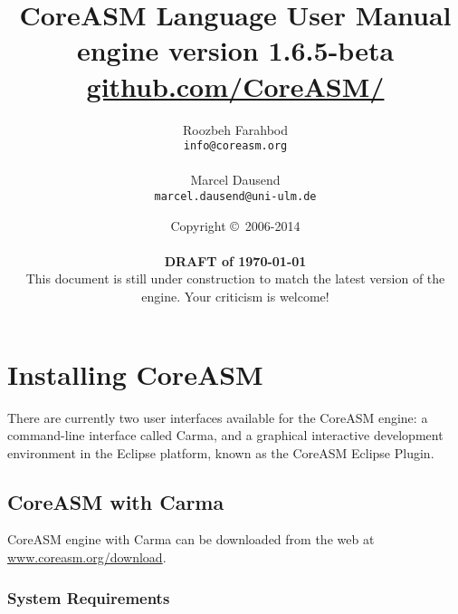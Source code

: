 \documentclass{article}
\newcommand{\version}{1.6.5-beta}
\newcommand{\CoreASM}{{\sffamily CoreASM}\xspace}
\newcommand{\Carma}{{\sffamily Carma}\xspace}
\newcommand{\copyrightNotice}[1]{{Copyright \copyright\ #1}}
\begin{document}

\title{\huge \CoreASM Language User Manual \\ {\Large engine version \version} \\ {\large \url{github.com/CoreASM/}}}

\author{Roozbeh Farahbod \\ \texttt{info@coreasm.org}\\\\Marcel Dausend \\ \texttt{marcel.dausend@uni-ulm.de}}  

\date{\copyrightNotice{2006-2014} \\~\\ {\bf DRAFT of \today} \\ {This document is still under construction to match the latest version of the engine. Your criticism is welcome!}}

 \maketitle

\newpage
\tableofcontents
\newpage


\section{Installing \CoreASM}

There are currently two user interfaces available for the \CoreASM engine: a
command-line interface called \Carma, and a graphical interactive
development environment in the Eclipse platform, known as the \CoreASM Eclipse
Plugin.


\subsection{\CoreASM with \Carma}

\CoreASM engine with \Carma can be downloaded from the web at \url{www.coreasm.org/download}.


\subsubsection{System Requirements}
\end{document}
